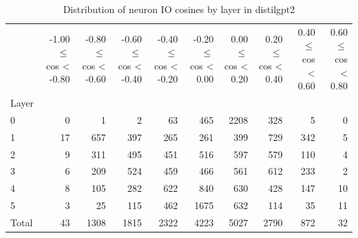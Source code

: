\begin{table}
\caption{Distribution of neuron IO cosines by layer in distilgpt2}
\label{tab:distilgpt2_half_coarse}
\begin{tabular}{lrrrrrrrrr}
 & -1.00 $\leq$ cos < -0.80 & -0.80 $\leq$ cos < -0.60 & -0.60 $\leq$ cos < -0.40 & -0.40 $\leq$ cos < -0.20 & -0.20 $\leq$ cos < 0.00 & 0.00 $\leq$ cos < 0.20 & 0.20 $\leq$ cos < 0.40 & 0.40 $\leq$ cos < 0.60 & 0.60 $\leq$ cos < 0.80 \\
Layer &  &  &  &  &  &  &  &  &  \\
0 & 0 & 1 & 2 & 63 & 465 & 2208 & 328 & 5 & 0 \\
1 & 17 & 657 & 397 & 265 & 261 & 399 & 729 & 342 & 5 \\
2 & 9 & 311 & 495 & 451 & 516 & 597 & 579 & 110 & 4 \\
3 & 6 & 209 & 524 & 459 & 466 & 561 & 612 & 233 & 2 \\
4 & 8 & 105 & 282 & 622 & 840 & 630 & 428 & 147 & 10 \\
5 & 3 & 25 & 115 & 462 & 1675 & 632 & 114 & 35 & 11 \\
Total & 43 & 1308 & 1815 & 2322 & 4223 & 5027 & 2790 & 872 & 32 \\
\end{tabular}
\end{table}
